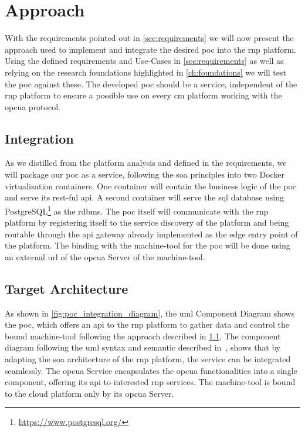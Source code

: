 \documentclass[
a4paper,
twoside,
headsepline,
cleardoublepage=empty,
parskip=half,
draft=false
]{scrbook}
\begin{document}
		\section{Approach} \label{sec:approach}

			With the requirements pointed out in \cref{sec:requirements} we will now present the approach used to implement and integrate the desired \gls{poc} into the \gls{rnp} platform. Using the defined requirements and Use-Cases in \cref{sec:requirements} as well as relying on the research foundations highlighted in \cref{ch:foundations} we will test the \gls{poc} against these. The developed \gls{poc} should be a service, independent of the \gls{rnp} platform to ensure a possible use on every \gls{cm} platform working with the \gls{opcua} protocol.

			\subsection{Integration} \label{subsec:integration}

				As we distilled from the platform analysis and defined in the requirements, we will package our \gls{poc} as a service, following the \gls{soa} principles into two Docker virtualization containers. One container will contain the business logic of the \gls{poc} and serve its \gls{rest}-ful \gls{api}. A second container will serve the \gls{sql} database using PostgreSQL\footnote{\url{https://www.postgresql.org/}} as the \gls{rdbms}.
				The \gls{poc} itself will communicate with the \gls{rnp} platform by registering itself to the service discovery of the platform and being routable through the \gls{api} gateway already implemented as the edge entry point of the platform.
				The binding with the machine-tool for the \gls{poc} will be done using an external \gls{url} of the \gls{opcua} Server of the machine-tool.

			\subsection{Target Architecture} \label{subsec:target_architecture}

				As shown in \cref{fig:poc_integration_diagram}, the \gls{uml} Component Diagram shows the \gls{poc}, which offers an \gls{api} to the \gls{rnp} platform to gather data and control the bound machine-tool following the approach described in \cref{subsec:integration}. The component diagram following the \gls{uml} syntax and semantic described in~\cite{uml2017}, shows that by adapting the \gls{soa} architecture of the \gls{rnp} platform, the service can be integrated
				seamlessly. 
				The \gls{opcua} Service encapsulates the \gls{opcua} functionalities into a single component, offering its \gls{api} to interested \gls{rnp} services. 
				The machine-tool is bound to the cloud platform only by its \gls{opcua} Server.
\end{document}
